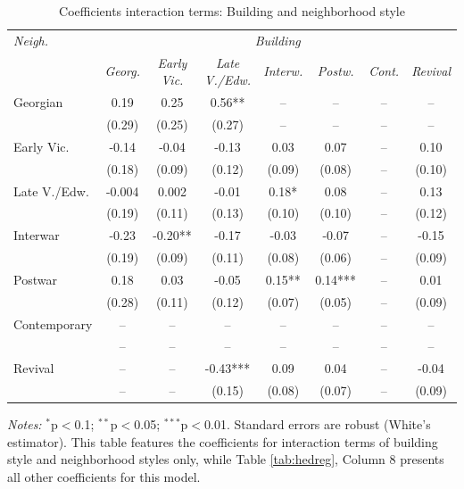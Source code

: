 \documentclass[]{article}
\begin{document}
\begin{table}[ht]
\centering
\caption{Coefficients interaction terms: Building and neighborhood style}
\label{tab:hedregint}
\begin{tabular}{lccccccc}
\toprule
\emph{Neigh.} & \multicolumn{7}{c}{\emph{Building}} \\
 \cmidrule(lr){1-1}
 \cmidrule(lr){2-8}
& \emph{Georg.} & \emph{Early Vic.} & \emph{Late V./Edw.} & \emph{Interw.} & \emph{Postw.} & \emph{Cont.} & \emph{Revival} \\ 
  \cmidrule(lr){2-8}

Georgian & 0.19 & 0.25 & 0.56** & -- & -- & -- & -- \\ 
   & (0.29) & (0.25) & (0.27) & -- & -- & -- & -- \\ 
Early Vic. & -0.14 & -0.04 & -0.13 & 0.03 & 0.07 & -- & 0.10 \\ 
  & (0.18) & (0.09) & (0.12) & (0.09) & (0.08) & -- & (0.10) \\ 
Late V./Edw. & -0.004 & 0.002 & -0.01 & 0.18* & 0.08 & -- & 0.13 \\ 
   & (0.19) & (0.11) & (0.13) & (0.10) & (0.10) & -- & (0.12) \\ 
Interwar & -0.23 & -0.20** & -0.17 & -0.03 & -0.07 & -- & -0.15 \\ 
  & (0.19) & (0.09) & (0.11) & (0.08) & (0.06) & -- & (0.09) \\ 
Postwar & 0.18 & 0.03 & -0.05 & 0.15** & 0.14*** & -- & 0.01 \\ 
   & (0.28) & (0.11) & (0.12) & (0.07) & (0.05) & -- & (0.09) \\ 
Contemporary & -- & -- & -- & -- & -- & -- & -- \\ 
  & -- & -- & -- & -- & -- & -- & -- \\ 
  Revival & -- & -- & -0.43*** & 0.09 & 0.04 & -- & -0.04 \\ 
   & -- & -- & (0.15) & (0.08) & (0.07) & -- & (0.09) \\ 
\bottomrule
\end{tabular}
\begin{minipage}{\textwidth}
\vspace{0.25cm}
\footnotesize \emph{Notes:} $^{*}$p$<$0.1; $^{**}$p$<$0.05; $^{***}$p$<$0.01. Standard errors are robust (White's estimator). This table features the coefficients for interaction terms of building style and neighborhood styles only, while Table \ref{tab:hedreg}, Column 8 presents all other coefficients for this model.
\end{minipage}

\end{table}
\end{document}
